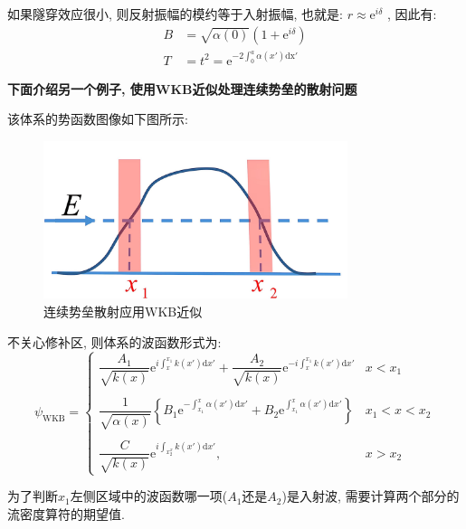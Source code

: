 \documentclass[a4paper, 11pt]{article}
\begin{document}
\begin{spacing}{1.2}
        如果隧穿效应很小, 则反射振幅的模约等于入射振幅, 也就是: $r \approx \mathrm{e}^{i\delta}$ , 因此有:
        \begin{equation}
          \begin{aligned}
            B &= \sqrt{\alpha(0)}\left(1+\mathrm{e}^{i\delta}\right)\\
            T &= t^2 = \mathrm{e}^{-2\int_0^a\alpha(x')\mathrm{dx'}}
          \end{aligned}
        \end{equation}

        \textbf{下面介绍另一个例子, 使用WKB近似处理连续势垒的散射问题}

        该体系的势函数图像如下图所示:

        \begin{figure}[H]
          \centering\includegraphics[width=3.5in]{image/WKB_continue_potential_scattering}
          \caption{连续势垒散射应用WKB近似}
        \end{figure}
        不关心修补区, 则体系的波函数形式为:
         \begin{equation}
           \psi_{\mathrm{WKB}} = \left\{\begin{array}{ll}
             \dfrac{A_1}{\sqrt{k(x)}}\mathrm{e}^{i\int_x^{x_1}k(x')\mathrm{d}x'}+%
             \dfrac{A_2}{\sqrt{k(x)}}\mathrm{e}^{-i\int_x^{x_1}k(x')\mathrm{d}x'} & x<x_1\\
             \\
             \dfrac{1}{\sqrt{\alpha(x)}}\left\{B_1\mathrm{e}^{-\int_{x_1}^x\alpha(x')\mathrm{d}x'}+%
                                               B_2\mathrm{e}^{\int_{x_1}^x\alpha(x')\mathrm{d}x'}\right\} & x_1<x< x_2\\
              \\
              \dfrac{C}{\sqrt{k(x)}}\mathrm{e}^{i\int_{x_2^x}k(x')\mathrm{d}x'}, & x>x_2
           \end{array}\right.
         \end{equation}

         为了判断$x_1$左侧区域中的波函数哪一项($A_1$还是$A_2$)是入射波, 需要计算两个部分的流密度算符的期望值.
         

\end{spacing}
\end{document}
